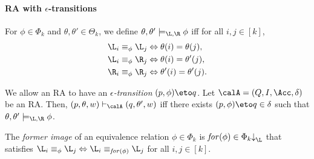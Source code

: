 

%
%

%

\def\QED{\hfill$\Box$}


\newcommand{\For}{\mathit{for}}


%

\paragraph{RA with $\epsilon$-transitions}
For $\phi\in\Phi_k$ and
$\theta,\theta'\in\Theta_k$,
we define $\theta,\theta'\models_{\L,\R}\phi$ iff
for all $i, j\in[k]$,
\begin{align*}
  \L_i\equiv_{\phi} \L_j &\Leftrightarrow \theta(i)=\theta(j), \\
  \L_i\equiv_{\phi} \R_j &\Leftrightarrow \theta(i)=\theta'(j), \\
  \R_i\equiv_{\phi} \R_j &\Leftrightarrow \theta'(i)=\theta'(j).
\end{align*}


We allow an RA to have an \emph{$\epsilon$-transition}
$(p,\phi)\eto q$.
Let $\calA=(Q,I,\Acc,\delta)$ be an RA\@.
Then, $(p,\theta,w)\vdash_{\calA} (q,\theta',w)$
iff there exists
${(p,\phi)\eto q}\in\delta$
such that
$\theta,\theta'\models_{\L,\R}\phi$. %

The {\em former image} of an equivalence relation
$\phi\in\Phi_k$ is
$\For(\phi)\in\Phi_k{\downarrow}_{\L}$
that satisfies $\L_i \equiv_{\phi} \L_j \Leftrightarrow \L_i \equiv_{\For(\phi)} \L_j$ for all $i,j\in[k]$.


